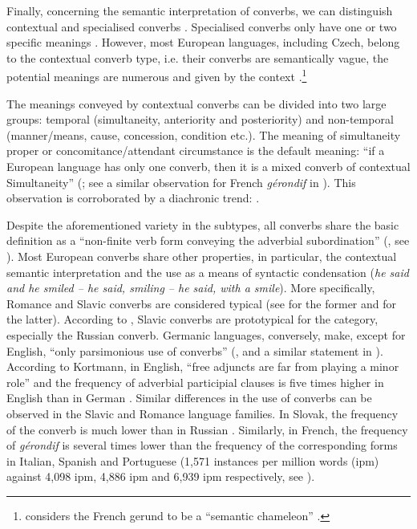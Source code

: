 \documentclass[output=paper,russian]{langsci/langscibook}
\begin{document}
Finally, concerning the semantic interpretation of converbs, we can distinguish contextual and specialised converbs \parencite[431]{nedjalkov98}. Specialised converbs only have one or two specific meanings \parencite[e.g. Finnish has a specialised converb conveying manner, see][443]{nedjalkov98}. However, most European languages, including Czech, belong to the contextual converb type, i.e. their converbs are semantically vague, the potential meanings are numerous and given by the context \parencites[for the factors influencing the semantic interpretation of converbs, see for example][]{koenig95}[337]{koeauw90}[29--41 for Czech]{dvorak83}[and for French][]{nadvornikova12}.\footnote{\textcite[157]{moortgat78} considers the French gerund to be a \enquote{semantic chameleon} \parencite[see also][]{halmoy03}.}

The meanings conveyed by contextual converbs can be divided into two large groups: temporal (simultaneity, anteriority and posteriority) and non-temporal (manner\slash means, cause, concession, condition etc.). The meaning of simultaneity proper or concomitance/attendant circumstance is the default meaning: \enquote{if a European language has only one converb, then it is a mixed converb of contextual Simultaneity} (\cite[432]{nedjalkov98}; see a similar observation for French \textit{gérondif} in \textcites[117]{kleiber07}[19]{kleiber09}). This observation is corroborated by a diachronic trend: .

Despite the aforementioned variety in the subtypes, all converbs share the basic definition as a \enquote{non-finite verb form conveying the adverbial subordination} (\cite[3]{haspelmath95}, see ). Most European converbs share other properties, in particular, the contextual semantic interpretation and the use as a means of syntactic condensation (\textit{he said and he smiled -- he said, smiling -- he said, with a smile}). More specifically, Romance and Slavic converbs are considered typical (see \cite[45]{haspelmath95} for the former and \cite[422]{nedjalkov98} for the latter). According to \textcite{nedjalkov98}, Slavic converbs are prototypical for the category, especially the Russian converb. Germanic languages, conversely, make, except for English, \enquote{only parsimonious use of converbs} (\cite[72]{koenig95}, and a similar statement in \textcite[192]{kortmann97}). According to Kortmann, in English, \enquote{free adjuncts are far from playing a minor role} and the frequency of adverbial participial clauses is five times higher in English than in German \parencite[192]{kortmann97}. Similar differences in the use of converbs can be observed in the Slavic and Romance language families. In Slovak, the frequency of the converb is much lower than in Russian \parencite[25]{brtkova04}. Similarly, in French, the frequency of \textit{gérondif} is several times lower than the frequency of the corresponding forms in Italian, Spanish and Portuguese (1,571 instances per million words (ipm) against 4,098 ipm, 4,886 ipm and 6,939 ipm respectively, see \cite[116]{ceretal20}).
\end{document}
